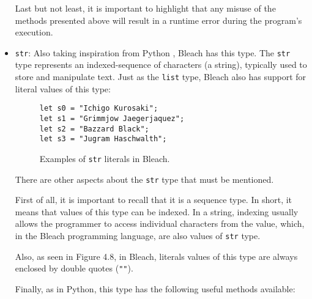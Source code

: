 \begin{itemize}
    Last but not least, it is important to highlight that any misuse of the methods presented above will result in a runtime error during the program's execution.

    \item \texttt{str}: Also taking inspiration from Python \cite{python_language}, Bleach has this type. The \texttt{str} type represents an indexed-sequence of characters (a string), typically used to store and manipulate text. Just as the \texttt{list} type, Bleach also has support for literal values of this type:

    \begin{figure}[H]
        \centering
        \begin{lstlisting}
let s0 = "Ichigo Kurosaki";
let s1 = "Grimmjow Jaegerjaquez";
let s2 = "Bazzard Black";
let s3 = "Jugram Haschwalth";
        \end{lstlisting}
        \caption{Examples of \texttt{str} literals in Bleach.}
    \end{figure}

    There are other aspects about the \texttt{str} type that must be mentioned.

    First of all, it is important to recall that it is a sequence type. In short, it means that values of this type can be indexed. In a string, indexing usually allows the programmer to access individual characters from the value, which, in the Bleach programming language, are also values of \texttt{str} type.

    Also, as seen in Figure 4.8, in Bleach, literals values of this type are always enclosed by double quotes (\texttt{""}).

    Finally, as in Python, this type has the following useful methods available:


\end{itemize}
